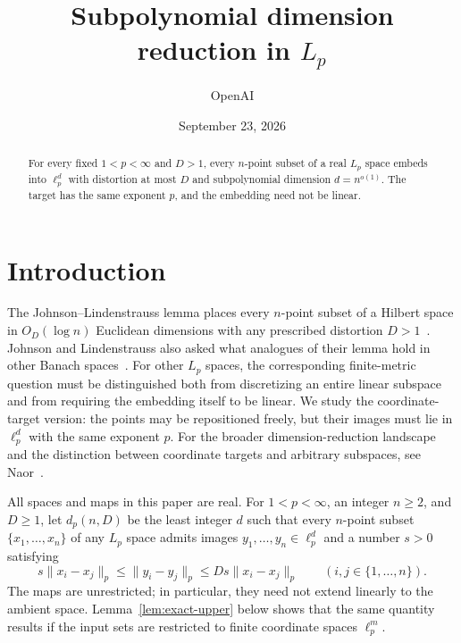 \documentclass[11pt]{article}
\title{Subpolynomial dimension reduction in $L_p$}
\author{OpenAI}
\date{September 23, 2026}
\theoremstyle{remark}
\numberwithin{equation}{section}
\begin{document}
\maketitle
\begin{abstract}
For every fixed $1<p<\infty$ and $D>1$, every $n$-point subset of a
real $L_p$ space embeds into $\ell_p^d$ with distortion at most $D$
and subpolynomial dimension $d=n^{o(1)}$. The target has the same
exponent $p$, and the embedding need not be linear.
\end{abstract}

\section{Introduction}

The Johnson--Lindenstrauss lemma places every $n$-point subset of a
Hilbert space in $O_D(\log n)$ Euclidean dimensions with any prescribed
distortion $D>1$~\cite[Lemma~1]{JohnsonLindenstrauss1984}.
Johnson and Lindenstrauss also asked what analogues of their lemma hold
in other Banach spaces~\cite[Problem~3]{JohnsonLindenstrauss1984}.
For other $L_p$ spaces, the corresponding finite-metric question must
be distinguished both from discretizing an entire linear subspace and
from requiring the embedding itself to be linear. We study the
coordinate-target version: the points may be repositioned freely, but
their images must lie in $\ell_p^d$ with the same exponent $p$.
For the broader dimension-reduction landscape and the distinction
between coordinate targets and arbitrary subspaces, see
Naor~\cite{Naor2018}.

All spaces and maps in this paper are real. For $1<p<\infty$, an integer
$n\ge2$, and $D\ge1$, let $d_p(n,D)$ be the least integer $d$ such that
every $n$-point subset $\{x_1,\ldots,x_n\}$ of any $L_p$ space admits
images $y_1,\ldots,y_n\in\ell_p^d$ and a number $s>0$ satisfying
\begin{equation}\label{eq:distortion}
 s\|x_i-x_j\|_p\le \|y_i-y_j\|_p
 \le Ds\|x_i-x_j\|_p\qquad(i,j\in\{1,\ldots,n\}).
\end{equation}
The maps are unrestricted; in particular, they need not extend linearly
to the ambient space. Lemma~\ref{lem:exact-upper} below shows that the
same quantity results if the input sets are restricted to finite
coordinate spaces $\ell_p^m$.
\end{document}
